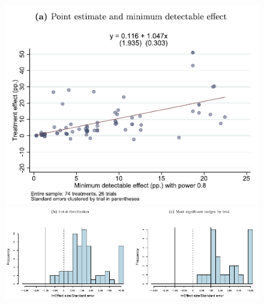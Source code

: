 \documentclass[dvipdfmx,11pt]{beamer}
\begin{document}
\begin{frame}{}
  \begin{figure}
    \centering
    \includegraphics[scale = .45]{fig_tab/os20220412/F5a.png}
    \includegraphics[scale = .5]{fig_tab/os20220412/F5bc.png}
  \end{figure}
\end{frame}
\end{document}
